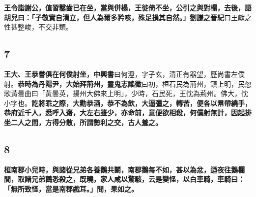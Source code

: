 \textbf{王令詣謝公，值習鑿齒已在坐，當與併榻，王徙倚不坐，公引之與對榻，去後，語胡兒曰：「子敬實自清立，但人為爾多矜咳，殊足損其自然。」}{\footnotesize \textbf{劉謙之晉紀}曰王獻之性甚整峻，不交非類。}

\subsection*{7}

\textbf{王大、王恭嘗俱在何僕射坐，}{\footnotesize \textbf{中興書}曰何澄，字子玄，清正有器望，歷尚書左僕射。}\textbf{恭時為丹陽尹，大始拜荊州，}{\footnotesize \textbf{靈鬼志謠徵}曰初，桓石民為荊州，鎮上明，民忽歌黃曇曲曰「黃曇英，揚州大佛來上明」，少時，石民死，王忱為荊州。佛大，忱小字也。}\textbf{訖將乖之際，大勸恭酒，恭不為飲，大逼彊之，轉苦，便各以帬帶繞手，恭府近千人，悉呼入齋，大左右雖少，亦命前，意便欲相殺，何僕射無計，因起排坐二人之間，方得分散，所謂勢利之交，古人羞之。}

\subsection*{8}

\textbf{桓南郡小兒時，與諸從兄弟各養鵝共鬬，南郡鵝每不如，甚以為忿，迺夜往鵝欄間，取諸兄弟鵝悉殺之，既曉，家人咸以驚駭，云是變怪，以白車騎，車騎曰：「無所致怪，當是南郡戲耳。」問，果如之。}